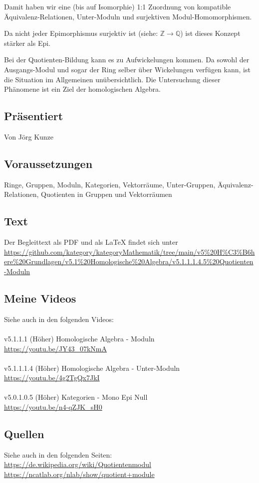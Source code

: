 \documentclass[a4paper]{amsart}
\theoremstyle{definition}
\newcommand{\Q}{\ensuremath{\mathbb{ Q }}}
\newcommand{\Z}{\ensuremath{\mathbb{ Z }}}
\begin{document}
Damit haben wir eine (bis auf Isomorphie) 1:1 Zuordnung von kompatible Äquivalenz-Relationen, Unter-Moduln und surjektiven Modul-Homomorphismen.

Da nicht jeder Epimorphismus surjektiv ist (siehe: $\Z \to \Q$) ist dieses Konzept stärker als Epi.

Bei der Quotienten-Bildung kann es zu Aufwickelungen kommen. Da sowohl der Ausgangs-Modul und sogar der Ring selber über Wickelungen verfügen kann, ist die Situation im Allgemeinen unübersichtlich. Die Untersuchung dieser Phänomene ist ein Ziel der homologischen Algebra.

\subsection*{Präsentiert}
Von Jörg Kunze

\subsection*{Voraussetzungen}
Ringe, Gruppen, Moduln, Kategorien, Vektorräume, Unter-Gruppen, Äquivalenz-Relationen, Quotienten in Gruppen und Vektorräumen

\subsection*{Text}
Der Begleittext als PDF und als LaTeX findet sich unter
{\tiny
   \url{https://github.com/kategory/kategoryMathematik/tree/main/v5%20H%C3%B6here%20Grundlagen/v5.1%20Homologische%20Algebra/v5.1.1.1.4.5%20Quotienten-Moduln}
}

\subsection*{Meine Videos}
Siehe auch in den folgenden Videos:\\
\\
v5.1.1.1 (Höher) Homologische Algebra - Moduln\\
\url{https://youtu.be/JY43_07kNmA}\\
\\
v5.1.1.1.4 (Höher) Homologische Algebra - Unter-Moduln\\
\url{https://youtu.be/4g2TgQx7JkI}\\
\\
v5.0.1.0.5 (Höher) Kategorien - Mono Epi Null\\
\url{https://youtu.be/n4-qZJK_sH0}

\subsection*{Quellen}
Siehe auch in den folgenden Seiten:\\
\url{https://de.wikipedia.org/wiki/Quotientenmodul}\\
\url{https://ncatlab.org/nlab/show/quotient+module}
\end{document}
